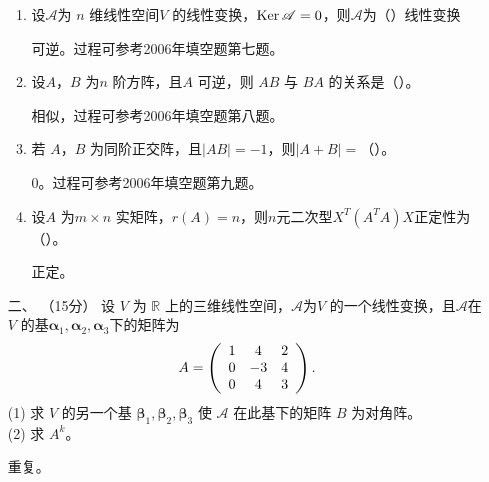 \begin{enumerate}[1~]
\begin{enumerate}[1.~]
\item
设$\mathscr { A }$为 $n$ 维线性空间$V$ 的线性变换，$\operatorname{Ker}\mathscr { A }=0$，则$\mathscr { A }$为（\quad）线性变换
\begin{solution}
可逆。过程可参考2006年填空题第七题。
\end{solution}

\item
设$A$，$B$ 为$n$ 阶方阵，且$A$ 可逆，则 $AB$ 与 $BA$ 的关系是（\quad）。
\begin{solution}
相似，过程可参考2006年填空题第八题。
\end{solution}

\item
若 $A$，$B$ 为同阶正交阵，且$|AB|=-1$，则$|A+B|=$（\quad）。
\begin{solution}
0。过程可参考2006年填空题第九题。
\end{solution}

\item
设$A$ 为$m\times n$ 实矩阵，$r(A)=n$，则$n$元二次型$X^T(A^T A)X$正定性为（\quad）。
\begin{solution}
正定。
\end{solution}
\end{enumerate}

\item[二、]（15分）
设 $V$ 为 $\mathbb{R}$ 上的三维线性空间，$\mathscr { A }$为$V$ 的一个线性变换，且$\mathscr { A }$在 $V$ 的基$\boldsymbol{\alpha} _ { 1 } , \boldsymbol{\alpha} _ { 2 } , \boldsymbol{\alpha} _ { 3 }$下的矩阵为\[
A = \left( \begin{array} { c c c } { 1 } & { 4 } & { 2 } \\ { 0 } & { - 3 } & { 4 } \\ { 0 } & { 4 } & { 3 } \end{array} \right).
\]
(1) 求 $V$ 的另一个基 $\boldsymbol{\beta} _ { 1 } , \boldsymbol{\beta} _ { 2 } , \boldsymbol{\beta} _ { 3 }$ 使 $\mathscr{A}$ 在此基下的矩阵 $B$ 为对角阵。\\
(2) 求 $A^k$。
\begin{solution}
重复。
\end{solution}


\end{enumerate}
